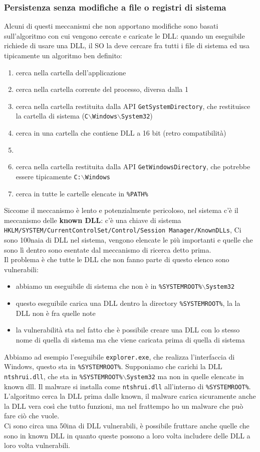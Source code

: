 \documentclass[12pt, oneside]{extbook}
\begin{document}
\subsubsection{Persistenza senza modifiche a file o registri di sistema}
Alcuni di questi meccanismi che non apportano modifiche sono basati sull'algoritmo con cui vengono cercate e caricate le DLL: quando un eseguibile richiede di usare una DLL, il SO la deve cercare fra tutti i file di sistema ed usa tipicamente un algoritmo ben definito:
\begin{enumerate}
	\item cerca nella cartella dell'applicazione
	\item cerca nella cartella corrente del processo, diversa dalla 1
	\item cerca nella cartella restituita dalla API \texttt{GetSystemDirectory}, che restituisce la cartella di sistema (\texttt{C$\backslash$Windows$\backslash$System32})
	\item cerca in una cartella che contiene DLL a 16 bit (retro compatibilità)
	\item \item cerca nella cartella restituita dalla API \texttt{GetWindowsDirectory}, che potrebbe essere tipicamente \texttt{C:$\backslash$Windows}
	\item cerca in tutte le cartelle elencate in \texttt{\%PATH\%}
\end{enumerate}
Siccome il meccanismo è lento e potenzialmente pericoloso, nel sistema c'è il meccanismo delle \textbf{known DLL}: c'è una chiave di sistema \texttt{HKLM/SYSTEM/CurrentControlSet/Control/Session Manager/KnownDLLs}, Ci sono 100naia di DLL nel sistema, vengono elencate le più importanti e quelle che sono lì dentro sono esentate dal meccanismo di ricerca detto prima.\\Il problema è che tutte le DLL che non fanno parte di questo elenco sono vulnerabili:
\begin{itemize}
	\item abbiamo un eseguibile di sistema che non è in \texttt{\%SYSTEMROOT\%$\backslash$System32}
	\item questo eseguibile carica una DLL dentro la directory \texttt{\%SYSTEMROOT\%}, la la DLL non è fra quelle note
	\item la vulnerabilità sta nel fatto che è possibile creare una DLL con lo stesso nome di quella di sistema ma che viene caricata prima di quella di sistema
\end{itemize}
Abbiamo ad esempio l'eseguibile \texttt{explorer.exe}, che realizza l'interfaccia di Windows, questo sta in \texttt{\%SYSTEMROOT\%}. Supponiamo che carichi la DLL \texttt{ntshrui.dll}, che sta in \texttt{\%SYSTEMROOT\%$\backslash$System32} ma non in quelle elencate in known dll. Il malware si installa come \texttt{ntshrui.dll} all'interno di \texttt{\%SYSTEMROOT\%}. L'algoritmo cerca la DLL prima dalle known, il malware carica sicuramente anche la DLL vera così che tutto funzioni, ma nel frattempo ho un malware che può fare ciò che vuole.\\Ci sono circa una 50ina di DLL vulnerabili, è possibile fruttare anche quelle che sono in known DLL in quanto queste possono a loro volta includere delle DLL a loro volta vulnerabili.
\end{document}
